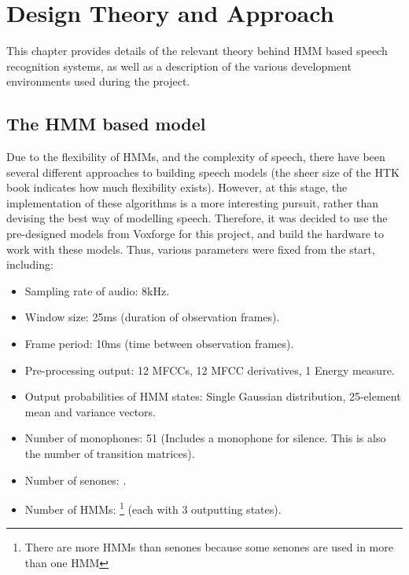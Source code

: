 \chapter{Design Theory and Approach} %
\label{cha:design_approach}


This chapter provides details of the relevant theory behind HMM based speech recognition systems, as well as a description of the various development environments used during the project.

\section{The HMM based model} %
\label{sec:the_hmm_based_model}
	Due to the flexibility of HMMs, and the complexity of speech, there have been several different approaches to building speech models (the sheer size of the HTK book indicates how much flexibility exists).  However, at this stage, the implementation of these algorithms is a more interesting pursuit, rather than devising the best way of modelling speech.  Therefore, it was decided to use the pre-designed models from Voxforge for this project, and build the hardware to work with these models.  Thus, various parameters were fixed from the start, including:

	\begin{itemize}
		\item Sampling rate of audio: 8kHz. %
		\item Window size: 25ms (duration of observation frames).
		\item Frame period: 10ms (time between observation frames).
		\item Pre-processing output: 12 MFCCs, 12 MFCC derivatives, 1 Energy measure.
		\item Output probabilities of HMM states: Single Gaussian distribution, 25-element mean and variance vectors.
		\item Number of monophones: 51 (Includes a monophone for silence.  This is also the number of transition matrices).
		\item Number of senones: .
		\item Number of HMMs: \footnote{There are more HMMs than senones because some senones are used in more than one HMM} (each with 3 outputting states).
	\end{itemize}


